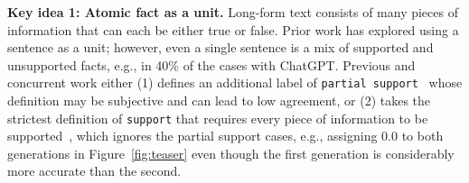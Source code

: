 \vspace{.3em}
\noindent
\textbf{Key idea 1: Atomic fact as a unit.}
Long-form text consists of many pieces of information that can each be either true or false.
Prior work has explored using a sentence as a unit; however, even a single sentence is a mix of supported and unsupported facts, e.g., in 40\% of the cases with ChatGPT.
Previous and concurrent work either (1) defines an additional label of \texttt{partial support}~\citep{manakul2023selfcheckgpt,liu2023evaluating} whose definition may be subjective and can lead to low agreement, %
or (2) takes the strictest definition of \texttt{support} that requires every piece of information to be supported~\citep{rashkin2021measuring,gao2022attributed}, which ignores the partial support cases, e.g., assigning 0.0 to both generations in Figure~\ref{fig:teaser} even though the first generation is considerably more accurate than the second.

